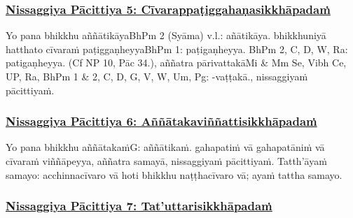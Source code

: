 \subsubsection*{\hyperref[forf-exp5]{Nissaggiya Pācittiya 5: Cīvarappaṭiggahaṇasikkhāpadaṁ}}
\label{np5}

Yo pana bhikkhu aññātikāya\makeatletter\hyperlink{endnote-appendix}\makeatother BhPm 2 (Syāma) v.l.: añātikāya. bhikkhuniyā hatthato cīvaraṁ paṭiggaṇheyya\makeatletter\hyperlink{endnote-appendix}\makeatother BhPm 1: paṭigaṇheyya. BhPm 2, C, D, W, Ra: patigaṇheyya. (Cf NP 10, Pāc 34.), aññatra pārivattakā\makeatletter\hyperlink{endnote-appendix}\makeatother Mi & Mm Se, Vibh Ce, UP, Ra, BhPm 1 & 2, C, D, G, V, W, Um, Pg: -vaṭṭakā., nissaggiyaṁ pācittiyaṁ.



\subsubsection*{\hyperref[forf-exp6]{Nissaggiya Pācittiya 6: Aññātakaviññattisikkhāpadaṁ}}
\label{np6}

Yo pana bhikkhu aññātakaṁ\makeatletter\hyperlink{endnote-appendix}\makeatother G: aññātikaṁ. gahapatiṁ vā gahapatāniṁ vā cīvaraṁ viññāpeyya, aññatra samayā, nissaggiyaṁ pācittiyaṁ. Tatth'āyaṁ samayo: acchinnacīvaro vā hoti bhikkhu naṭṭhacīvaro vā; ayaṁ tattha samayo.



\subsubsection*{\hyperref[forf-exp7]{Nissaggiya Pācittiya 7: Tat'uttarisikkhāpadaṁ}}
\label{np7}

